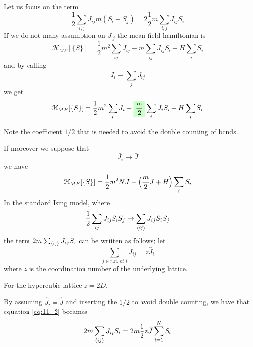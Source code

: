 \documentclass[../main/main.tex]{subfiles}
\begin{document}
Let us focus on the term
\begin{equation}
  \frac{1}{2} \sum_{i,j }^{} J_{ij} m (S_i+S_j) = 2 \frac{1}{2} m \sum_{i,j }^{} J_{ij}  S_i
  \label{eq:11_2}
\end{equation}
If we do not many assumption on \( J_{ij} \) the mean field hamiltonian is
\begin{equation}
\mathcal{H}_{MF} [ \{ S \}  ] = \frac{1}{2} m^2 \sum_{ij}^{} J_{ij} - m \sum_{ij}^{} J_{ij} S_i - H \sum_{i}^{} S_i
\end{equation}
and by calling
\begin{equation}
  \bar{J_i} \equiv  \sum_{j}^{} J_{ij}
\end{equation}
we get
\begin{equation}
    \mathcal{H}_{MF} [ \{ S \}  ]  = \frac{1}{2} m^2 \sum_{i}^{} \bar{J_i} - \mathcolorbox{green!20}{\frac{m}{2}} \sum_{i}^{} \bar{J_i} S_i - H \sum_{i}^{} S_i
\end{equation}
\begin{remark}
Note the coefficient \( 1/2 \) that is needed to avoid the double counting of bonds.
\end{remark}
If moreover we suppose that
\begin{equation*}
  \bar{J_i} \rightarrow \bar{J}
\end{equation*}
we have
\begin{equation}
  \mathcal{H}_{MF} [ \{ S \}  ] = \frac{1}{2} m^2 N \bar{J} - \qty(\frac{m}{2}\bar{J} +H) \sum_{i}^{} S_i
\end{equation}
In the standard Ising model, where
\begin{equation}
  \frac{1}{2} \sum_{ij}^{} J_{ij} S_i S_j \rightarrow \sum_{\expval{ij} }^{} J_{ij}    S_i S_j
\end{equation}
the term \( 2 m \sum_{\expval{ij} }^{}  J_{ij} S_i \) can be written as follows;
let
\begin{equation}
  \sum_{j \in n.n.\text{ of } i}^{} J_{ij} = z \hat{J}_i
\end{equation}
where \( z \) is the coordination number of the underlying lattice.
\begin{remark}
For the hypercubic lattice \( z=2D \).
\end{remark}
By assuming \( \hat{J}_i = \hat{J}  \) and inserting the \( 1/2 \) to avoid double counting, we have that equation \eqref{eq:11_2} becames
\begin{equation}
  2m \sum_{\expval{ij} }^{}  J_{ij} S_i = 2 m \frac{1}{2} z \hat{J} \sum_{i=1}^{N} S_i
\end{equation}
\end{document}
